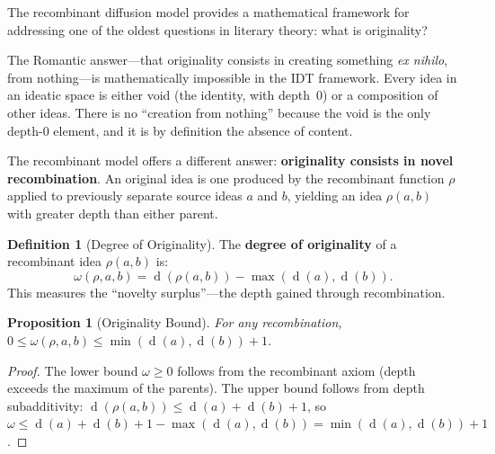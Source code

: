 \documentclass[11pt,openany]{book}
\theoremstyle{definition}
\newtheorem{definition}[axiom]{Definition}
\theoremstyle{plain}
\newtheorem{proposition}[axiom]{Proposition}
\theoremstyle{remark}
\newcommand{\depth}{\operatorname{d}}       %
\begin{document}
The recombinant diffusion model provides a mathematical framework for addressing one of the oldest questions in literary theory: what is originality?

The Romantic answer---that originality consists in creating something \emph{ex nihilo}, from nothing---is mathematically impossible in the IDT framework. Every idea in an ideatic space is either void (the identity, with depth~0) or a composition of other ideas. There is no ``creation from nothing'' because the void is the only depth-0 element, and it is by definition the absence of content.

The recombinant model offers a different answer: \textbf{originality consists in novel recombination}. An original idea is one produced by the recombinant function $\rho$ applied to previously separate source ideas $a$ and $b$, yielding an idea $\rho(a, b)$ with greater depth than either parent.

\begin{definition}[Degree of Originality]
The \textbf{degree of originality} of a recombinant idea $\rho(a, b)$ is:
\[
\omega(\rho, a, b) = \depth(\rho(a, b)) - \max(\depth(a), \depth(b)).
\]
This measures the ``novelty surplus''---the depth gained through recombination.
\end{definition}

\begin{proposition}[Originality Bound]
For any recombination, $0 \leq \omega(\rho, a, b) \leq \min(\depth(a), \depth(b)) + 1$.
\end{proposition}

\begin{proof}
The lower bound $\omega \geq 0$ follows from the recombinant axiom (depth exceeds the maximum of the parents). The upper bound follows from depth subadditivity: $\depth(\rho(a, b)) \leq \depth(a) + \depth(b) + 1$, so $\omega \leq \depth(a) + \depth(b) + 1 - \max(\depth(a), \depth(b)) = \min(\depth(a), \depth(b)) + 1$.
\end{proof}
\end{document}
